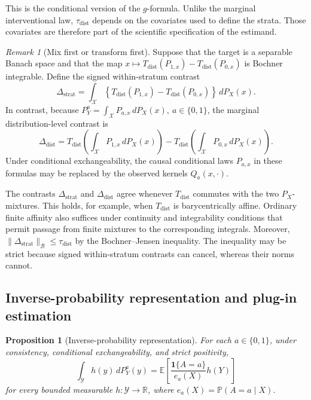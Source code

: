 \documentclass[11pt,a4paper]{article}
\theoremstyle{plain}
\newtheorem{proposition}[theorem]{Proposition}
\theoremstyle{definition}
\theoremstyle{remark}
\newtheorem{remark}[theorem]{Remark}
\newcommand{\1}{\mathbbm{1}}
\begin{document}
This is the conditional version of the \(g\)-formula. Unlike the marginal interventional law, \(\tau_{\mathrm{dist}}\) depends on the covariates used to define the strata. Those covariates are therefore part of the scientific specification of the estimand.

\begin{remark}[Mix first or transform first]
\label{rem:mix-first}
Suppose that the target is a separable Banach space and that the map \(x \longmapsto T_{\mathrm{dist}}(P_{1,x})
- T_{\mathrm{dist}}(P_{0,x})\) is Bochner integrable. Define the signed within-stratum contrast
\[
\Delta_{\mathrm{strat}}
=
\int_{\mathcal X}
\left\{
T_{\mathrm{dist}}(P_{1,x})
-
T_{\mathrm{dist}}(P_{0,x})
\right\}
\,dP_X(x).
\]
In contrast, because \(P_Y^a = \int_{\mathcal X}P_{a,x}\,dP_X(x), \ a\in\{0,1\}\), the marginal distribution-level contrast is
\[
\Delta_{\mathrm{dist}}
=
T_{\mathrm{dist}}\!\left(
\int_{\mathcal X}P_{1,x}\,dP_X(x)
\right)
-
T_{\mathrm{dist}}\!\left(
\int_{\mathcal X}P_{0,x}\,dP_X(x)
\right).
\]
Under conditional exchangeability, the causal conditional laws
\(P_{a,x}\) in these formulas may be replaced by the observed kernels \(Q_a(x,\cdot)\).

The contrasts \(\Delta_{\mathrm{strat}}\) and
\(\Delta_{\mathrm{dist}}\) agree whenever \(T_{\mathrm{dist}}\) commutes with the two \(P_X\)-mixtures. This holds, for example, when \(T_{\mathrm{dist}}\) is barycentrically affine. Ordinary finite affinity also suffices under continuity and integrability conditions
that permit passage from finite mixtures to the corresponding
integrals. Moreover,
\(\|\Delta_{\mathrm{strat}}\|_{\mathcal B} \leq \tau_{\mathrm{dist}}\) by the Bochner--Jensen inequality. The inequality may be strict because signed within-stratum contrasts can cancel, whereas their norms cannot.
\end{remark}


\subsection{Inverse-probability representation and plug-in estimation}
\label{subsec:ipw-interventional-laws}

\begin{proposition}[Inverse-probability representation]
\label{prop:ipw-law}
For each \(a\in\{0,1\}\), under consistency, conditional
exchangeability, and strict positivity,
\[
\int_{\mathcal Y}h(y)\,dP_Y^a(y)
=
\mathbb E\left[
\frac{\mathbf 1\{A=a\}}{e_a(X)}h(Y)
\right]
\]
for every bounded measurable \(h:\mathcal Y\to\mathbb R\), where \(e_a(X)=\mathbb P(A=a\mid X)\).
\end{proposition}
\end{document}
